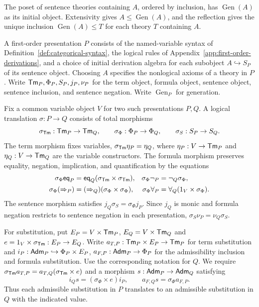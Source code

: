 The poset of sentence theories containing $A$, ordered by inclusion,
has $\operatorname{Gen}(A)$ as its initial object. Extensivity gives
$A\leq\operatorname{Gen}(A)$, and the reflection gives the unique
inclusion $\operatorname{Gen}(A)\leq T$ for each theory $T$ containing $A$.

A first-order presentation $P$ consists of the named-variable
syntax of Definition~\ref{def:categorical-syntax}, the logical rules of
Appendix~\ref{app:first-order-derivations}, and a choice of initial
derivation algebra for each subobject $A\hookrightarrow S_P$ of its
sentence object. Choosing $A$ specifies the nonlogical axioms of a
theory in $P$. Write $\mathsf{Tm}_P,\Phi_P,S_P,j_P,\nu_P$ for the term
object, formula object, sentence object, sentence inclusion, and
sentence negation. Write $\operatorname{Gen}_P$ for generation.

Fix a common variable object $V$ for two such presentations $P,Q$.
A logical translation $\sigma:P\to Q$ consists of total morphisms
\[
 \sigma_{\mathsf{Tm}}:\mathsf{Tm}_P\to\mathsf{Tm}_Q,\qquad
 \sigma_{\Phi}:\Phi_P\to\Phi_Q,\qquad
 \sigma_S:S_P\to S_Q.
\]
The term morphism fixes variables, $\sigma_{\mathsf{Tm}}\eta_P=\eta_Q$,
where $\eta_P:V\to\mathsf{Tm}_P$ and $\eta_Q:V\to\mathsf{Tm}_Q$ are the variable constructors.
The formula morphism preserves equality, negation, implication, and quantification by the equations
\begin{align*}
 \sigma_\Phi\mathsf{eq}_P&=\mathsf{eq}_Q(\sigma_{\mathsf{Tm}}\times\sigma_{\mathsf{Tm}}),&
 \sigma_\Phi\neg_P&=\neg_Q\sigma_\Phi,\\
 \sigma_\Phi({\Rightarrow}_P)&=({\Rightarrow}_Q)(\sigma_\Phi\times\sigma_\Phi),&
 \sigma_\Phi{\forall}_P&={\forall}_Q(1_V\times\sigma_\Phi).
\end{align*}
The sentence morphism satisfies $j_Q\sigma_S=\sigma_\Phi j_P$.
Since $j_Q$ is monic and formula negation restricts to sentence
negation in each presentation, $\sigma_S\nu_P=\nu_Q\sigma_S$.

For substitution, put $E_P=V\times\mathsf{Tm}_P$, $E_Q=V\times\mathsf{Tm}_Q$ and
$e=1_V\times\sigma_{\mathsf{Tm}}:E_P\to E_Q$. Write
$a_{T,P}:\mathsf{Tm}_P\times E_P\to\mathsf{Tm}_P$ for term substitution and
$i_P:\mathsf{Adm}_P\hookrightarrow\Phi_P\times E_P$,
$a_{F,P}:\mathsf{Adm}_P\to\Phi_P$ for the admissibility inclusion and
formula substitution. Use the corresponding notation for $Q$.
We require $\sigma_{\mathsf{Tm}}a_{T,P}=a_{T,Q}(\sigma_{\mathsf{Tm}}\times e)$
and a morphism $s:\mathsf{Adm}_P\to\mathsf{Adm}_Q$ satisfying
\[
 i_Q s=(\sigma_\Phi\times e)i_P,\qquad
 a_{F,Q}s=\sigma_\Phi a_{F,P}.
\]
Thus each admissible substitution in $P$ translates to an admissible
substitution in $Q$ with the indicated value.

